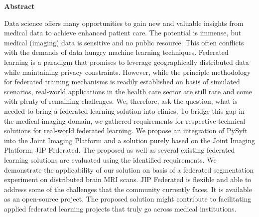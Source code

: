 {\Large \textbf{Abstract}} 

\bigskip

Data science offers many opportunities to gain new and valuable insights from medical data to achieve enhanced patient care. The potential is immense, but medical (imaging) data is sensitive and no public resource. This often conflicts with the demands of data hungry machine learning techniques. Federated learning is a paradigm that promises to leverage geographically distributed data while maintaining privacy constraints. However, while the principle methodology for federated training mechanisms is readily established on basis of simulated scenarios, real-world applications in the health care sector are still rare and come with plenty of remaining challenges.
We, therefore, ask the question, what is needed to bring a federated learning solution into clinics.
To bridge this gap in the medical imaging domain, we gathered requirements for respective technical solutions for real-world federated learning. We propose an integration of PySyft into the Joint Imaging Platform and a solution purely based on the Joint Imaging Platform: JIP Federated. The proposed as well as several existing federated learning solutions are evaluated using the identified requirements.
We demonstrate the applicability of our solution on basis of a federated segmentation experiment on distributed brain MRI scans. JIP Federated is flexible and able to address some of the challenges that the community currently faces. It is available as an open-source project.
The proposed solution might contribute to facilitating applied federated learning projects that truly go across medical institutions.







